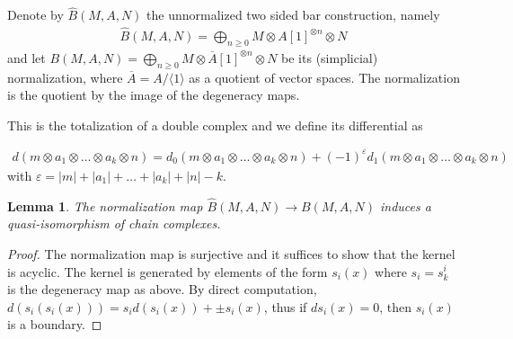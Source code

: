 \documentclass{scrartcl}
\theoremstyle{plain}
\newtheorem{lemma}[theorem]{Lemma}
\theoremstyle{definition}
\renewcommand{\epsilon}{\varepsilon}
\newcommand{\abs}[1]{\left\lvert#1\right\rvert}
\begin{document}
Denote by $\hat B(M, A, N)$ the unnormalized two sided bar construction, namely 
\begin{align*}
    \hat B(M, A, N) = \bigoplus_{n\geq 0} M\otimes A[1]^{\otimes n} \otimes N
\end{align*}
and let $B(M, A, N) = \bigoplus_{n\geq 0} M\otimes \overline {A}[1]^{\otimes n}\otimes N$ be its (simplicial) normalization, where $\overline A = A/\langle 1\rangle$ as a quotient of vector spaces. The normalization is the quotient by the image of the degeneracy maps. 

This is the totalization of a double complex and we define its differential as 

\begin{align*}
    d(m\otimes a_1\otimes \dots\otimes a_k\otimes n) = d_0(m\otimes a_1\otimes \dots\otimes a_k\otimes n) + (-1)^\epsilon d_1(m\otimes a_1\otimes \dots\otimes a_k\otimes n)
\end{align*}
with $\epsilon = \abs{m}+\abs{a_1}+\dots+\abs{a_{k}} + \abs{n} - k$.

\begin{lemma}\label{lem:bar-normalization}
    The normalization map $\hat B(M, A, N)\to B(M, A, N)$ induces a quasi-isomorphism of chain complexes.
\end{lemma}
\begin{proof}
The normalization map is surjective and it suffices to show that the kernel is acyclic. The kernel is generated by elements of the form $s_i(x)$ where $s_i = s^i_k$ is the degeneracy map as above. By direct computation, $d(s_i(s_i(x))) = s_i d(s_i(x)) + \pm s_i(x)$, thus if $ds_i(x) = 0$, then $s_i(x)$ is a boundary.
\end{proof}
\end{document}
